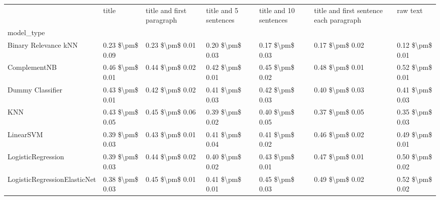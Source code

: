 \begin{tabular}{lllllll}
\toprule
{} &            title & title and first paragraph & title and 5 sentences & title and 10 sentences & title and first sentence each paragraph &             raw text \\
model\_type                      &                  &                           &                       &                        &                                         &                      \\
\midrule
Binary Relevance kNN            &  0.23 \$\textbackslash pm\$ 0.09 &           0.23 \$\textbackslash pm\$ 0.01 &       0.20 \$\textbackslash pm\$ 0.03 &        0.17 \$\textbackslash pm\$ 0.03 &                         0.17 \$\textbackslash pm\$ 0.02 &      0.12 \$\textbackslash pm\$ 0.01 \\
ComplementNB                    &  0.46 \$\textbackslash pm\$ 0.01 &           0.44 \$\textbackslash pm\$ 0.02 &       0.42 \$\textbackslash pm\$ 0.01 &        0.45 \$\textbackslash pm\$ 0.02 &                         0.48 \$\textbackslash pm\$ 0.01 &      0.52 \$\textbackslash pm\$ 0.01 \\
Dummy Classifier                &  0.43 \$\textbackslash pm\$ 0.01 &           0.42 \$\textbackslash pm\$ 0.02 &       0.41 \$\textbackslash pm\$ 0.03 &        0.42 \$\textbackslash pm\$ 0.03 &                         0.40 \$\textbackslash pm\$ 0.03 &      0.41 \$\textbackslash pm\$ 0.03 \\
KNN                             &  0.43 \$\textbackslash pm\$ 0.05 &           0.45 \$\textbackslash pm\$ 0.06 &       0.39 \$\textbackslash pm\$ 0.02 &        0.40 \$\textbackslash pm\$ 0.05 &                         0.37 \$\textbackslash pm\$ 0.05 &      0.35 \$\textbackslash pm\$ 0.03 \\
LinearSVM                       &  0.39 \$\textbackslash pm\$ 0.03 &           0.43 \$\textbackslash pm\$ 0.01 &       0.41 \$\textbackslash pm\$ 0.04 &        0.41 \$\textbackslash pm\$ 0.02 &                         0.46 \$\textbackslash pm\$ 0.02 &      0.49 \$\textbackslash pm\$ 0.01 \\
LogisticRegression              &  0.39 \$\textbackslash pm\$ 0.03 &           0.44 \$\textbackslash pm\$ 0.02 &       0.40 \$\textbackslash pm\$ 0.02 &        0.43 \$\textbackslash pm\$ 0.01 &                         0.47 \$\textbackslash pm\$ 0.01 &      0.50 \$\textbackslash pm\$ 0.02 \\
LogisticRegressionElasticNet    &  0.38 \$\textbackslash pm\$ 0.03 &           0.45 \$\textbackslash pm\$ 0.01 &       0.41 \$\textbackslash pm\$ 0.01 &        0.45 \$\textbackslash pm\$ 0.03 &                         0.49 \$\textbackslash pm\$ 0.02 &      0.52 \$\textbackslash pm\$ 0.02 \\

\end{tabular}
